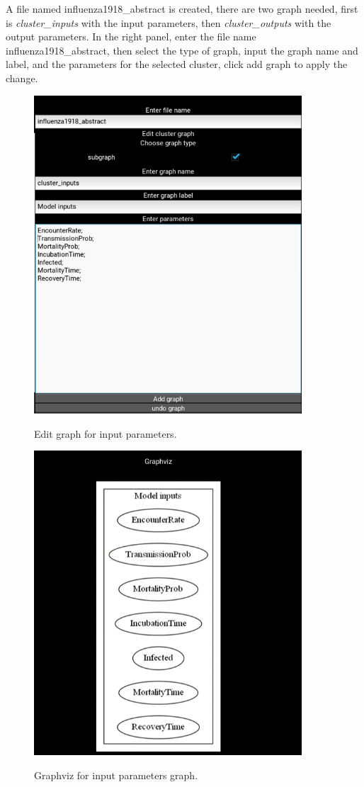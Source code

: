 A file named influenza1918\_abstract is created, there are two graph needed, first is \textsl{cluster\_inputs} with the input parameters, then \textsl{cluster\_outputs} with the output parameters. In the right panel, enter the file name influenza1918\_abstract, then select the type of graph, input the graph name and label, and the parameters for the selected cluster, click add graph to apply the change.
\begin{figure}[H]
	\centering
	\includegraphics[width=10cm]{figures/influenzaTestProcess3.png}\\
	\caption{Edit graph for input parameters.}
	\label{fig:figure21}
\end{figure}
\begin{figure}[H]
	\centering
	\includegraphics[width=10cm]{figures/influenzaTestProcess4.png}\\
	\caption{Graphviz for input parameters graph.}
	\label{fig:figure22}
\end{figure}
